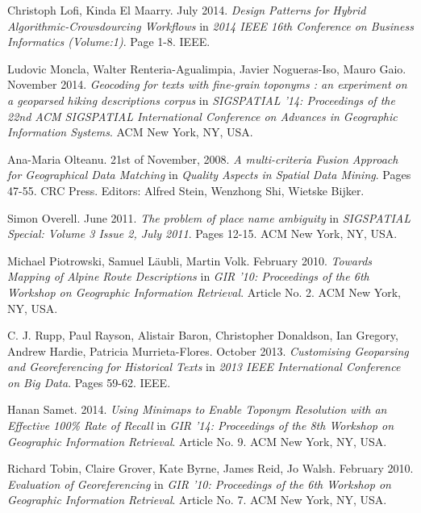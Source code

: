 \documentclass[11pt]{article}
\begin{document}
\begin{thebibliography}{9}
  Christoph Lofi, Kinda El Maarry. July 2014. \emph{Design Patterns for Hybrid Algorithmic-Crowsdourcing Workflows} in \emph{2014 IEEE 16th Conference on Business Informatics (Volume:1)}. Page 1-8. IEEE.
  
  Ludovic Moncla, Walter Renteria-Agualimpia, Javier Nogueras-Iso, Mauro Gaio. November 2014. \emph{Geocoding for texts with fine-grain toponyms : an experiment on a geoparsed hiking descriptions corpus} in \emph{SIGSPATIAL '14: Proceedings of the 22nd ACM SIGSPATIAL International Conference on Advances in Geographic Information Systems}. ACM New York, NY, USA.
  
  Ana-Maria Olteanu. 21st of November, 2008. \emph{A multi-criteria Fusion Approach for Geographical Data Matching} in \emph{Quality Aspects in Spatial Data Mining}. Pages 47-55. CRC Press. Editors: Alfred Stein, Wenzhong Shi, Wietske Bijker.
  
  Simon Overell. June 2011. \emph{The problem of place name ambiguity} in \emph{SIGSPATIAL Special: Volume 3 Issue 2, July 2011}. Pages 12-15. ACM New York, NY, USA.

  Michael Piotrowski, Samuel Läubli, Martin Volk. February 2010. \emph{Towards Mapping of Alpine Route Descriptions} in \emph{GIR '10: Proceedings of the 6th Workshop on Geographic Information Retrieval}. Article No. 2. ACM New York, NY, USA.
  
  C. J. Rupp, Paul Rayson, Alistair Baron, Christopher Donaldson, Ian Gregory, Andrew Hardie, Patricia Murrieta-Flores. October 2013. \emph{Customising Geoparsing and Georeferencing for Historical Texts} in \emph{2013 IEEE International Conference on Big Data}. Pages 59-62. IEEE.

  Hanan Samet. 2014. \emph{Using Minimaps to Enable Toponym Resolution with an
Effective 100\% Rate of Recall} in \emph{GIR '14: Proceedings of the 8th Workshop on Geographic Information Retrieval}. Article No. 9. ACM New York, NY, USA.

  
  Richard Tobin, Claire Grover, Kate Byrne, James Reid, Jo Walsh. February 2010. \emph{Evaluation of Georeferencing} in \emph{GIR '10: Proceedings of the 6th Workshop on Geographic Information Retrieval}. Article No. 7. ACM New York, NY, USA.
  

\end{thebibliography}
\end{document}
